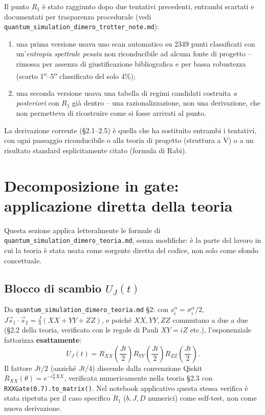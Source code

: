 \documentclass[11pt,a4paper]{article}
\begin{document}
Il punto $R_1$ è stato raggiunto dopo due tentativi precedenti, entrambi
scartati e documentati per trasparenza procedurale (vedi
\texttt{quantum\_simulation\_dimero\_trotter\_note.md}):
\begin{enumerate}
\item una prima versione usava uno scan automatico su 2349 punti classificati
con un'\emph{entropia spettrale pesata} non riconducibile ad alcuna fonte di
progetto -- rimossa per assenza di giustificazione bibliografica e per bassa
robustezza (scarto 1\textsuperscript{o}--5\textsuperscript{o} classificato
del solo 4\%);
\item una seconda versione usava una tabella di regimi candidati costruita
\emph{a posteriori} con $R_1$ già dentro -- una razionalizzazione, non una
derivazione, che non permetteva di ricostruire come si fosse arrivati al
punto.
\end{enumerate}
La derivazione corrente (\S2.1--2.5) è quella che ha sostituito entrambi i
tentativi, con ogni passaggio riconducibile o alla teoria di progetto
(struttura a V) o a un risultato standard esplicitamente citato (formula di
Rabi).

\section{Decomposizione in gate: applicazione diretta della teoria}

Questa sezione applica letteralmente le formule di
\texttt{quantum\_simulation\_dimero\_teoria.md}, senza modifiche: è la parte
del lavoro in cui la teoria è stata usata come sorgente diretta del codice,
non solo come sfondo concettuale.

\subsection{Blocco di scambio $U_J(t)$}

Da \texttt{quantum\_simulation\_dimero\_teoria.md} \S2: con
$s_i^\alpha=\sigma_i^\alpha/2$, $J\vec s_1\cdot\vec s_2=\frac{J}{4}(XX+YY+ZZ)$,
e poiché $XX,YY,ZZ$ commutano a due a due (\S2.2 della teoria, verificato
con le regole di Pauli $XY=iZ$ etc.), l'esponenziale fattorizza
\textbf{esattamente}:
$$U_J(t) = R_{XX}\!\left(\frac{Jt}{2}\right)R_{YY}\!\left(\frac{Jt}{2}\right)R_{ZZ}\!\left(\frac{Jt}{2}\right).$$
Il fattore $Jt/2$ (anziché $Jt/4$) discende dalla convenzione Qiskit
$R_{XX}(\theta)=e^{-i\frac\theta2 XX}$, verificata numericamente nella
teoria \S2.3 con \texttt{RXXGate(0.7).to\_matrix()}. Nel notebook applicativo
questa stessa verifica è stata ripetuta per il caso specifico $R_1$
($b,J,D$ numerici) come self-test, non come nuova derivazione.
\end{document}
